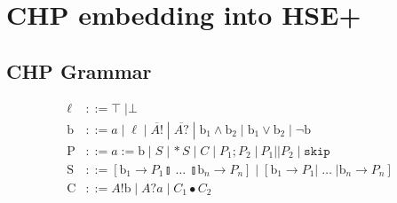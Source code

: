 \documentclass[times, 10pt]{article}
\begin{document}
\section{CHP embedding into HSE+}

\begin{comment}
\subsection{HSE+ Grammar}
\begin{align*}
    \ell & ::= \top \; | \bot \\
    \mathrm{b} & ::= a \; | \; \ell \; | \; \mathrm{b}_1 \wedge \mathrm{b}_2 \; | \; \mathrm{b}_1 \vee \mathrm{b}_2 \; | \; \lnot \mathrm{b} \\
    \mathrm{P} & ::= a := \mathrm{b} \; | \; S \; | \, *S \; | \; P_1; P_2 \; | \: P_1 || P_2 \; | \; \mathtt{skip} \\
    \mathrm{S} & ::= [ \mathrm{b}_1 \rightarrow P_1 \talloblong \; \ldots \; \talloblong \mathrm{b}_n \rightarrow P_n ] \; | \; [ \mathrm{b}_1 \rightarrow P_1 | \; \ldots \; | \mathrm{b}_n \rightarrow P_n ] \\
\end{align*}

\end{comment}


\subsection{CHP Grammar}
\begin{align*}
    \ell & ::= \top \; | \bot \\
    \mathrm{b} & ::= a \; | \; \ell \; | \; \overline{A!} \; | \; \overline{A?} \; | \; \mathrm{b}_1 \wedge \mathrm{b}_2 \; | \; \mathrm{b}_1 \vee \mathrm{b}_2 \; | \; \lnot \mathrm{b} \\
    \mathrm{P} & ::= a := \mathrm{b} \; | \; S \; | \, *S \; | \; C \; | \; P_1; P_2 \; | \: P_1 || P_2 \; | \; \mathtt{skip} \\
    \mathrm{S} & ::= [ \mathrm{b}_1 \rightarrow P_1 \talloblong \; \ldots \; \talloblong \mathrm{b}_n \rightarrow P_n ] \; | \; [ \mathrm{b}_1 \rightarrow P_1 | \; \ldots \; | \mathrm{b}_n \rightarrow P_n ] \\
    \mathrm{C} & ::= A!\mathrm{b} \; | \; A?a \; | \; C_1 \bullet C_2
\end{align*}
\end{document}
